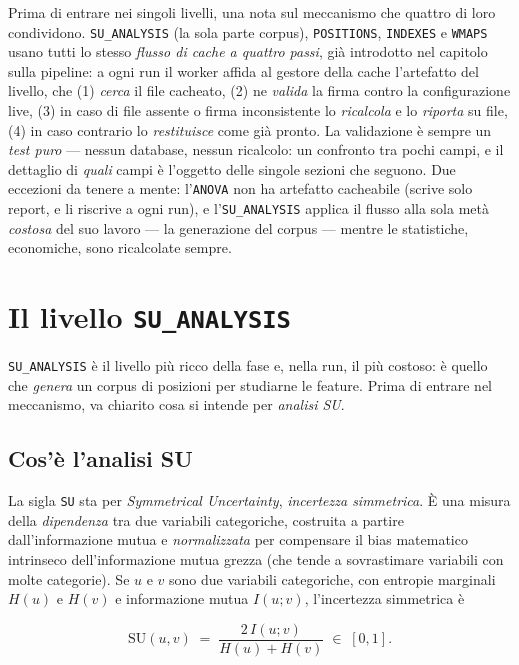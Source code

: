Prima di entrare nei singoli livelli, una nota sul meccanismo che quattro di
loro condividono. \texttt{SU\_ANALYSIS} (la sola parte corpus),
\texttt{POSITIONS}, \texttt{INDEXES} e \texttt{WMAPS} usano tutti lo stesso
\emph{flusso di cache a quattro passi}, già introdotto nel capitolo sulla
pipeline: a ogni run il worker affida al gestore della cache l'artefatto del
livello, che (1) \emph{cerca} il file cacheato, (2) ne \emph{valida} la firma
contro la configurazione live, (3) in caso di file assente o firma
inconsistente lo \emph{ricalcola} e lo \emph{riporta} su file, (4) in caso
contrario lo \emph{restituisce} come già pronto. La validazione è sempre un
\emph{test puro} — nessun database, nessun ricalcolo: un confronto tra pochi
campi, e il dettaglio di \emph{quali} campi è l'oggetto delle singole
sezioni che seguono. Due eccezioni da tenere a mente: l'\texttt{ANOVA} non ha
artefatto cacheabile (scrive solo report, e li riscrive a ogni run), e
l'\texttt{SU\_ANALYSIS} applica il flusso alla sola metà \emph{costosa} del
suo lavoro — la generazione del corpus — mentre le statistiche, economiche,
sono ricalcolate sempre.

\section{Il livello \texttt{SU\_ANALYSIS}}
\label{sec:corpus-su}

\texttt{SU\_ANALYSIS} è il livello più ricco della fase e, nella run, il
più costoso: è quello che \emph{genera} un corpus di posizioni per studiarne
le feature. Prima di entrare nel meccanismo, va chiarito cosa si intende per
\emph{analisi SU}.

\subsection{Cos'è l'analisi SU}

La sigla \texttt{SU} sta per \emph{Symmetrical Uncertainty},
\emph{incertezza simmetrica}. È una misura della \emph{dipendenza} tra due
variabili categoriche, costruita a partire dall'informazione mutua e
\emph{normalizzata} per compensare il bias matematico intrinseco
dell'informazione mutua grezza (che tende a sovrastimare variabili con molte
categorie). Se $u$ e $v$ sono due variabili categoriche, con entropie
marginali $H(u)$ e $H(v)$ e informazione mutua $I(u;v)$, l'incertezza
simmetrica è

\begin{equation}
  \mathrm{SU}(u,v) \;=\; \frac{2\,I(u;v)}{H(u) + H(v)} \;\in\; [0,1].
  \label{eq:su}
\end{equation}

